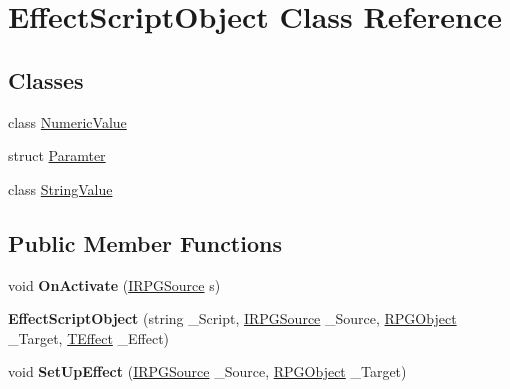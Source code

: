 \hypertarget{class_effect_script_object}{}\section{Effect\+Script\+Object Class Reference}
\label{class_effect_script_object}
\subsection*{Classes}
\begin{DoxyCompactItemize}
\item 
class \hyperlink{class_effect_script_object_1_1_numeric_value}{Numeric\+Value}
\item 
struct \hyperlink{struct_effect_script_object_1_1_paramter}{Paramter}
\item 
class \hyperlink{class_effect_script_object_1_1_string_value}{String\+Value}
\end{DoxyCompactItemize}
\subsection*{Public Member Functions}
\begin{DoxyCompactItemize}
\item 
\hypertarget{class_effect_script_object_ab6709e3186a3e37df774d961a06600a6}{}void {\bfseries On\+Activate} (\hyperlink{interface_i_r_p_g_source}{I\+R\+P\+G\+Source} s)\label{class_effect_script_object_ab6709e3186a3e37df774d961a06600a6}

\item 
\hypertarget{class_effect_script_object_a1f68ebfee4023bf30a52ea9408970523}{}{\bfseries Effect\+Script\+Object} (string \+\_\+\+Script, \hyperlink{interface_i_r_p_g_source}{I\+R\+P\+G\+Source} \+\_\+\+Source, \hyperlink{class_r_p_g_object}{R\+P\+G\+Object} \+\_\+\+Target, \hyperlink{class_t_effect}{T\+Effect} \+\_\+\+Effect)\label{class_effect_script_object_a1f68ebfee4023bf30a52ea9408970523}

\item 
\hypertarget{class_effect_script_object_aaa6b0f4677c9ee3de33693789ed271e4}{}void {\bfseries Set\+Up\+Effect} (\hyperlink{interface_i_r_p_g_source}{I\+R\+P\+G\+Source} \+\_\+\+Source, \hyperlink{class_r_p_g_object}{R\+P\+G\+Object} \+\_\+\+Target)\label{class_effect_script_object_aaa6b0f4677c9ee3de33693789ed271e4}

\end{DoxyCompactItemize}
